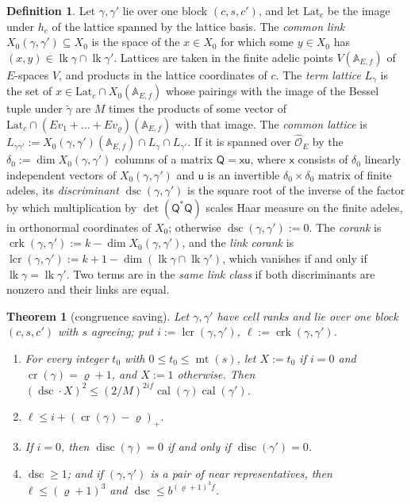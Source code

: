 \documentclass[reqno]{amsart}
\theoremstyle{definition}
\newtheorem{definition}{Definition}[section]
\theoremstyle{plain}
\newtheorem{theorem}{Theorem}[section]
\theoremstyle{remark}
\newcommand{\Oc}{\mathcal O}
\newcommand{\disc}{\operatorname{disc}}
\newcommand{\lk}{\operatorname{lk}}
\newcommand{\mt}{\operatorname{mt}}
\newcommand{\calb}{\operatorname{cal}}
\newcommand{\cri}{\operatorname{cr}}
\newcommand{\dsc}{\operatorname{dsc}}
\newcommand{\crk}{\operatorname{crk}}
\newcommand{\lcr}{\operatorname{lcr}}
\newcommand{\A}{\mathbb A}
\begin{document}
\begin{definition}\label{def:common}
Let \(\gamma,\gamma'\) lie over one block \((c,s,c')\), and let \(\mathrm{Lat}_c\) be the image under \(h_c\) of the lattice spanned by the lattice basis.  The \emph{common link} \(X_0(\gamma,\gamma')\subseteq X_0\) is the space of the \(x\in X_0\) for which some \(y\in X_0\) has \((x,y)\in\lk\gamma\cap\lk\gamma'\).  Lattices are taken in the finite adelic points \(V(\A_{E,f})\) of \(E\)-spaces \(V\), and products in the lattice coordinates of \(c\).  The \emph{term lattice} \(L_\gamma\) is the set of \(x\in\mathrm{Lat}_c\cap X_0(\A_{E,f})\) whose pairings with the image of the Bessel tuple under \(\tilde\gamma\) are \(M\) times the products of some vector of \(\mathrm{Lat}_c\cap(Ev_1+\dots+Ev_\varrho)(\A_{E,f})\) with that image.  The \emph{common lattice} is \(L_{\gamma\gamma'}:=X_0(\gamma,\gamma')(\A_{E,f})\cap L_\gamma\cap L_{\gamma'}\).  If it is spanned over \(\hat{\Oc}_E\) by the \(\delta_0:=\dim X_0(\gamma,\gamma')\) columns of a matrix \(\mathsf Q=\mathsf x\mathsf u\), where \(\mathsf x\) consists of \(\delta_0\) linearly independent vectors of \(X_0(\gamma,\gamma')\) and \(\mathsf u\) is an invertible \(\delta_0\times\delta_0\) matrix of finite adeles, its \emph{discriminant} \(\dsc(\gamma,\gamma')\) is the square root of the inverse of the factor by which multiplication by \(\det(\mathsf Q^*\mathsf Q)\) scales Haar measure on the finite adeles, in orthonormal coordinates of \(X_0\); otherwise \(\dsc(\gamma,\gamma'):=0\).  The \emph{corank} is \(\crk(\gamma,\gamma'):=k-\dim X_0(\gamma,\gamma')\), and the \emph{link corank} is \(\lcr(\gamma,\gamma'):=k+1-\dim(\lk\gamma\cap\lk\gamma')\), which vanishes if and only if \(\lk\gamma=\lk\gamma'\).  Two terms are in the \emph{same link class} if both discriminants are nonzero and their links are equal.
\end{definition}

\begin{theorem}[congruence saving]\label{thm:gain}
Let \(\gamma,\gamma'\) have cell ranks and lie over one block \((c,s,c')\) with \(s\) agreeing; put \(i:=\lcr(\gamma,\gamma')\), \(\ell:=\crk(\gamma,\gamma')\).
\begin{enumerate}
\item[(a)] For every integer \(t_0\) with \(0\le t_0\le\mt(s)\), let \(X:=t_0\) if \(i=0\) and \(\cri(\gamma)=\varrho+1\), and \(X:=1\) otherwise.  Then \((\dsc\cdot X)^2\le(2/M)^{2if}\calb(\gamma)\calb(\gamma')\).
\item[(b)] \(\ell\le i+(\cri(\gamma)-\varrho)_+\).
\item[(c)] If \(i=0\), then \(\disc(\gamma)=0\) if and only if \(\disc(\gamma')=0\).
\item[(d)] \(\dsc\ge1\); and if \((\gamma,\gamma')\) is a pair of near representatives, then \(\ell\le(\varrho+1)^3\) and \(\dsc\le b^{(\varrho+1)^3f}\).
\end{enumerate}
\end{theorem}
\end{document}
